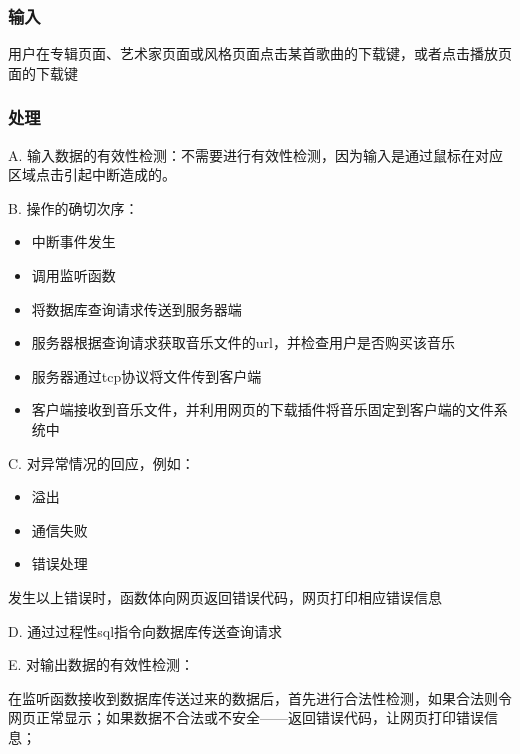 			\subsubsection{输入}
			
			用户在专辑页面、艺术家页面或风格页面点击某首歌曲的下载键，或者点击播放页面的下载键
		 
		 
			\subsubsection{处理}
			
			
			
			A. 输入数据的有效性检测：不需要进行有效性检测，因为输入是通过鼠标在对应区域点击引起中断造成的。
			
			B. 操作的确切次序：
			\begin{adjustwidth}{2cm}{1cm}\qquad
				\begin{itemize}
					\item 中断事件发生
					\item 调用监听函数
					\item 将数据库查询请求传送到服务器端
					\item 服务器根据查询请求获取音乐文件的url，并检查用户是否购买该音乐
					\item 服务器通过tcp协议将文件传到客户端
					\item 客户端接收到音乐文件，并利用网页的下载插件将音乐固定到客户端的文件系统中
				\end{itemize}		
			\end{adjustwidth}
			 
			
			C. 对异常情况的回应，例如：
			\begin{adjustwidth}{2cm}{1cm}\qquad
				\begin{itemize}
					\item 溢出
					\item 通信失败
					\item 错误处理
				\end{itemize}		
			\end{adjustwidth}
			
				发生以上错误时，函数体向网页返回错误代码，网页打印相应错误信息
			
D. 通过过程性sql指令向数据库传送查询请求
					
			E. 对输出数据的有效性检测：
			
			在监听函数接收到数据库传送过来的数据后，首先进行合法性检测，如果合法则令网页正常显示；如果数据不合法或不安全——返回错误代码，让网页打印错误信息；
			
